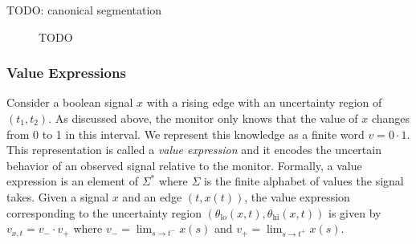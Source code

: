 \begin{example} \label{ex:canonseg}
	\alert{TODO: canonical segmentation}
\end{example}

\begin{figure} 
	\centering
	\caption{\alert{TODO}}
	\label{fig:canonseg}
\end{figure}


\subsubsection{Value Expressions}
Consider a boolean signal $x$ with a rising edge with an uncertainty region of $(t_1, t_2)$.
As discussed above, the monitor only knows that the value of $x$ changes from 0 to 1 in this interval.
We represent this knowledge as a finite word $v = 0 \cdot 1$.
This representation is called a \emph{value expression} and it encodes the uncertain behavior of an observed signal relative to the monitor.
Formally, a value expression is an element of $\Sigma^*$ where $\Sigma$ is the finite alphabet of values the signal takes.
Given a signal $x$ and an edge $(t, x(t))$, the value expression corresponding to the uncertainty region $(\theta_{\text{lo}}(x,t), \theta_{\text{hi}}(x,t))$ is given by $v_{x,t} = v_- \cdot v_+$ where $v_- = \lim_{s \to t^-} x(s)$ and $v_+ = \lim_{s \to t^+} x(s)$.

